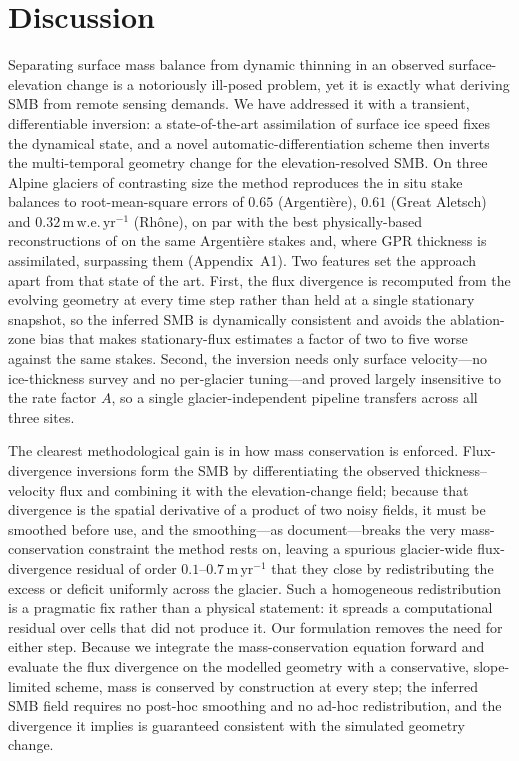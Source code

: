 \section{Discussion}\label{sec:discussion}

Separating surface mass balance from dynamic thinning in an observed
surface-elevation change is a notoriously ill-posed problem, yet it is exactly what
deriving SMB from remote sensing demands. We have addressed it with a transient,
differentiable inversion: a state-of-the-art assimilation of surface ice speed fixes
the dynamical state, and a novel automatic-differentiation scheme then inverts the
multi-temporal geometry change for the elevation-resolved SMB. On three Alpine
glaciers of contrasting size the method reproduces the in situ stake balances to
root-mean-square errors of $0.65$ (Argentière), $0.61$ (Great Aletsch) and
$0.32\,\mathrm{m\,w.e.\,yr^{-1}}$ (Rhône), on par with the best physically-based
reconstructions of \citet{kneib2024} on the same Argentière stakes and, where GPR
thickness is assimilated, surpassing them (Appendix~A1).
Two features set the approach apart from that state of the art.
First, the flux divergence is recomputed from the evolving geometry at every time step
rather than held at a single stationary snapshot, so the inferred SMB is dynamically
consistent and avoids the ablation-zone bias that makes stationary-flux estimates a
factor of two to five worse against the same stakes.
Second, the inversion needs only surface velocity---no
ice-thickness survey and no per-glacier tuning---and proved largely insensitive to
the rate factor $A$, so a single glacier-independent pipeline transfers across all
three sites.

The clearest methodological gain is in how mass conservation is enforced.
Flux-divergence inversions form the SMB by differentiating the observed
thickness--velocity flux and combining it with the elevation-change field; because
that divergence is the spatial derivative of a product of two noisy fields, it must
be smoothed before use, and the smoothing---as \citet{kneib2024}
document---breaks
the very mass-conservation constraint the method rests on, leaving a spurious
glacier-wide flux-divergence residual of order $0.1$--$0.7\,\mathrm{m\,yr^{-1}}$ that
they close by redistributing the excess or deficit uniformly across the glacier. Such
a homogeneous redistribution is a pragmatic fix rather than a physical statement: it
spreads a computational residual over cells that did not produce it. Our formulation
removes the need for either step. Because we integrate the mass-conservation equation
forward and evaluate the flux divergence on the modelled geometry with a
conservative, slope-limited scheme, mass is conserved by construction at every step;
the inferred SMB field requires no post-hoc smoothing and no ad-hoc redistribution,
and the divergence it implies is guaranteed consistent with the simulated geometry
change.

